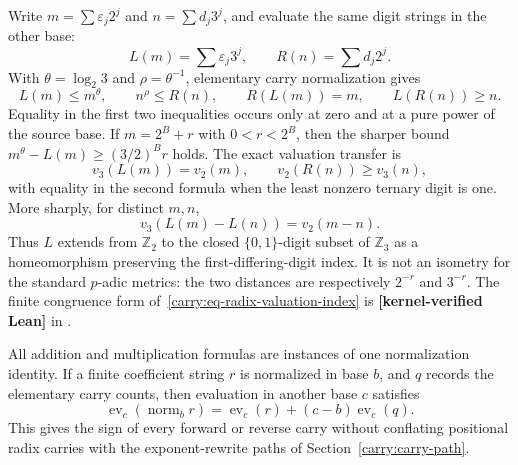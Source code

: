 \documentclass[11pt,oneside]{article}
\theoremstyle{definition}
\theoremstyle{remark}
\newcommand{\lean}[1]{\texttt{\detokenize{#1}}}
\newcommand{\statuslean}{\textcolor{leanblue}{\textbf{[kernel-verified Lean]}}}
\begin{document}
Write $m=\sum\varepsilon_j2^j$ and $n=\sum d_j3^j$, and evaluate the same digit strings in
the other base:
\[
 L(m)=\sum\varepsilon_j3^j,\qquad R(n)=\sum d_j2^j.
\]
With $\theta=\log_2 3$ and $\rho=\theta^{-1}$, elementary carry normalization gives
\begin{equation}
 L(m)\le m^\theta,\qquad n^\rho\le R(n),\qquad
 R(L(m))=m,\qquad L(R(n))\ge n.
 \label{carry:eq-digit-lift-orders}
\end{equation}
Equality in the first two inequalities occurs only at zero and at a pure power of the
source base.  If $m=2^B+r$ with $0<r<2^B$, then the sharper bound
$m^\theta-L(m)\ge(3/2)^Br$ holds.  The exact valuation transfer is
\[
 v_3(L(m))=v_2(m),\qquad v_2(R(n))\ge v_3(n),
\]
with equality in the second formula when the least nonzero ternary digit is one.
More sharply, for distinct $m,n$,
\begin{equation}
 v_3(L(m)-L(n))=v_2(m-n).
 \label{carry:eq-radix-valuation-index}
\end{equation}
Thus $L$ extends from $\mathbb Z_2$ to the closed $\{0,1\}$-digit subset of
$\mathbb Z_3$ as a homeomorphism preserving the first-differing-digit index.  It is not an
isometry for the standard $p$-adic metrics: the two distances are respectively $2^{-r}$ and
$3^{-r}$.  The finite congruence form of~\eqref{carry:eq-radix-valuation-index} is
\statuslean{} in \lean{RadixShadow}.

All addition and multiplication formulas are instances of one normalization identity.  If
a finite coefficient string $r$ is normalized in base $b$, and $q$ records the elementary
carry counts, then evaluation in another base $c$ satisfies
\begin{equation}
 \operatorname{ev}_c(\operatorname{norm}_b r)
 =\operatorname{ev}_c(r)+(c-b)\operatorname{ev}_c(q).
 \label{carry:eq-generic-normalization}
\end{equation}
This gives the sign of every forward or reverse carry without conflating positional radix
carries with the exponent-rewrite paths of Section~\ref{carry:carry-path}.
\end{document}
